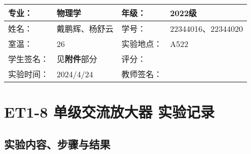 \documentclass[dvipsnames, svgnames,a4paper,11pt]{article}
\begin{document}
	
	
	
	
	
	
	\clearpage
	
	\begin{table}
		\renewcommand\arraystretch{1.7}
		\centering
		\begin{tabularx}{\textwidth}{|X|X|X|X|}
			\hline
			专业： & 物理学 & 年级： & 2022级 \\
			\hline
			姓名： & 戴鹏辉、杨舒云 & 学号： & 22344016、22344020\\
			\hline
			室温： & 26\degree & 实验地点： & A522 \\
			\hline
			学生签名：& 见\textbf{附件}部分 & 评分： &\\
			\hline
			实验时间：& 2024/4/24 & 教师签名：&\\
			\hline
		\end{tabularx}
	\end{table}
	
	\section{ET1-8 单级交流放大器  \quad\heiti 实验记录}
	
	\subsection{实验内容、步骤与结果}
	
\end{document}
